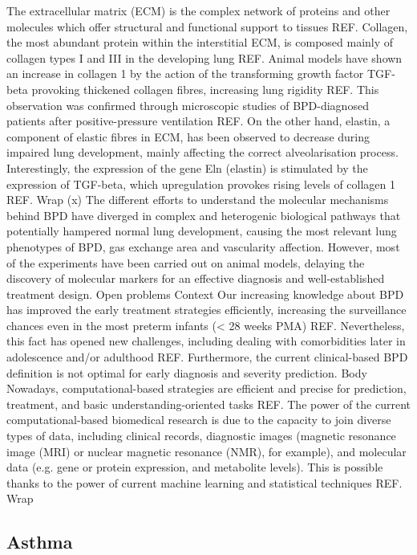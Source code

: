 The extracellular matrix (ECM) is the complex network of proteins and other molecules which offer structural and functional support to tissues REF. Collagen, the most abundant protein within the interstitial ECM, is composed mainly of collagen types I and III in the developing lung REF. Animal models have shown an increase in collagen 1 by the action of the transforming growth factor TGF-beta provoking thickened collagen fibres, increasing lung rigidity REF. This observation was confirmed through microscopic studies of BPD-diagnosed patients after positive-pressure ventilation REF. On the other hand, elastin, a component of elastic fibres in ECM, has been observed to decrease during impaired lung development, mainly affecting the correct alveolarisation process. Interestingly, the expression of the gene Eln (elastin) is stimulated by the expression of TGF-beta, which upregulation provokes rising levels of collagen 1 REF. 
Wrap (x)
The different efforts to understand the molecular mechanisms behind BPD have diverged in complex and heterogenic biological pathways that potentially hampered normal lung development, causing the most relevant lung phenotypes of BPD, gas exchange area and vascularity affection. However, most of the experiments have been carried out on animal models, delaying the discovery of molecular markers for an effective diagnosis and well-established treatment design.
Open problems
Context
Our increasing knowledge about BPD has improved the early treatment strategies efficiently, increasing the surveillance chances even in the most preterm infants (< 28 weeks PMA) REF. Nevertheless, this fact has opened new challenges, including dealing with comorbidities later in adolescence and/or adulthood REF. Furthermore, the current clinical-based BPD definition is not optimal for early diagnosis and severity prediction. 
Body
Nowadays, computational-based strategies are efficient and precise for prediction, treatment, and basic understanding-oriented tasks REF. The power of the current computational-based biomedical research is due to the capacity to join diverse types of data, including clinical records, diagnostic images (magnetic resonance image (MRI) or nuclear magnetic resonance (NMR), for example), and molecular data (e.g. gene or protein expression, and metabolite levels). This is possible thanks to the power of current machine learning and statistical techniques REF. 
Wrap



    \subsection{Asthma}
